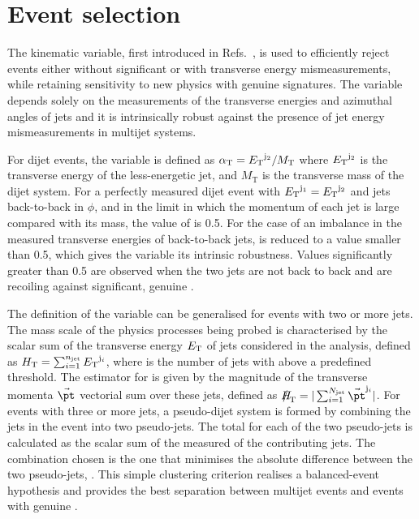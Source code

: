 \section{Event selection}
\label{sec:event_selection}

The \alphat kinematic variable, first introduced in
Refs.~\cite{Randall:2008rw, RA1Paper}, is used to efficiently reject
events either without significant \met or with transverse energy
mismeasurements, while retaining sensitivity to new physics with
genuine \met signatures. The variable \alphat depends solely on the
measurements of the transverse energies and azimuthal angles of jets
and it is intrinsically robust against the presence of jet energy
mismeasurements in multijet systems.

For dijet events, the \alphat variable is defined as $\alpha_{\text T} =
{E_{\text T}}^{\rm j_2}/M_\text{T}$ where ${E_{\text T}}^{\rm j_2}$ is the transverse
energy of the less-energetic jet, and $M_\text{T}$ is the transverse
mass of the dijet system. 
For a perfectly measured dijet event with ${E_{\text T}}^{\mathrm{j}_1} =
{E_{\text T}}^{\mathrm{j}_2}$ and jets back-to-back in $\phi$, and in the limit
in which the momentum of each jet is large compared with its mass, the
value of \alphat is 0.5. For the case of an imbalance in the measured
transverse energies of back-to-back jets, \alphat is reduced to a
value smaller than 0.5, which gives the variable its intrinsic
robustness. %
Values significantly greater than 0.5 are observed when the two jets
are not back to back and are recoiling against significant, genuine
\met.

The definition of the \alphat variable can be generalised for events
with two or more jets. The mass scale of the physics processes being
probed is characterised by the scalar sum of the transverse energy
${E_{\text T}}$ of jets considered in the analysis, defined as $\mbox{$H_\text{T}$} =
\sum_{i=1}^{n_{\text{jet}}} {E_{\text T}}^{\mathrm{j}_i}$, where \njet is the number of
jets with \Et above a predefined threshold. The estimator for \met is
given by the magnitude of the transverse momenta $\vec{\pt}$ vectorial
sum over these jets, defined as $\mht = |\sum_{i=1}^{N_\text{jet}}
\vec{\pt}^{\mathrm{j}_i}|$.  For events with three or more jets, a
pseudo-dijet system is formed by combining the jets in the event into
two pseudo-jets. The total \Et for each of the two pseudo-jets is
calculated as the scalar sum of the measured \Et of the contributing
jets. The combination chosen is the one that minimises the absolute
\Et difference between the two pseudo-jets, \dht. This simple
clustering criterion realises a balanced-event hypothesis and provides
the best separation between multijet events and events with genuine
\met. 


